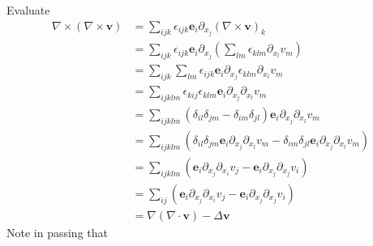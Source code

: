 \documentclass[12pt]{article}
\begin{document}
Evaluate
\begin{align}
	\nabla\times(\nabla\times\bm{v})
	 & = \sum\limits_{ijk}\epsilon_{ijk}\bm{e}_i\partial_{x_j}(\nabla\times\bm{v})_k                                                                                                                     \\
	 & = \sum\limits_{ijk}\epsilon_{ijk}\bm{e}_i\partial_{x_j} \left( \sum\limits_{lm} \epsilon_{klm}\partial_{x_l}v_m \right)                                                                           \\
	 & = \sum\limits_{ijk}\sum\limits_{lm}\epsilon_{ijk}\bm{e}_i\partial_{x_j}\epsilon_{klm}\partial_{x_l}v_m                                                                                            \\
	 & = \sum\limits_{ijklm} \epsilon_{kij}\epsilon_{klm} \bm{e}_i\partial_{x_j}\partial_{x_l}v_m                                                                         \label{eq:epsilonepsilon}      \\
	 & = \sum\limits_{ijklm} \left( \delta_{il}\delta_{jm} - \delta_{im}\delta_{jl} \right)\bm{e}_i\partial_{x_j}\partial_{x_l}v_m                                        \label{eq:deltafour}           \\
	 & = \sum\limits_{ijklm} \left( \delta_{il}\delta_{jm}\bm{e}_i\partial_{x_j}\partial_{x_l}v_m - \delta_{im}\delta_{jl}\bm{e}_i\partial_{x_j}\partial_{x_l}v_m \right) \label{eq:deltafourtwo}        \\
	 & = \sum\limits_{ijklm} \left( \bm{e}_i\partial_{x_j}\partial_{x_i}v_j - \bm{e}_i\partial_{x_j}\partial_{x_j}v_i \right)                                             \label{eq:deltafourtwoshorter} \\
	 & = \sum\limits_{ij}\left( \bm{e}_i\partial_{x_j}\partial_{x_i}v_j-\bm{e}_i\partial_{x_j}\partial_{x_j}v_i\right)                                                                                   \\
	 & = \nabla (\nabla\cdot\bm{v})-\Delta \bm{v}
\end{align}
Note in passing that 
\end{document}
